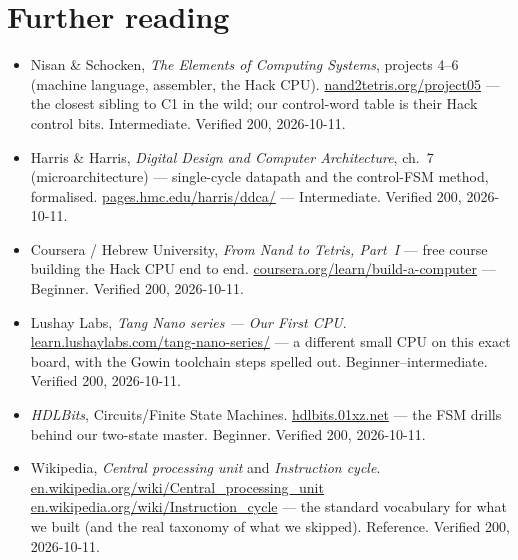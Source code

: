 \section*{Further reading}

\begin{itemize}
\item Nisan \& Schocken, \emph{The Elements of Computing Systems},
projects 4--6 (machine language, assembler, the Hack CPU).\newline
\url{nand2tetris.org/project05} --- the closest sibling to C1 in the
wild; our control-word table is their Hack control bits.
Intermediate. Verified 200, 2026-10-11.
\item Harris \& Harris, \emph{Digital Design and Computer
Architecture}, ch.~7 (microarchitecture) --- single-cycle datapath
and the control-FSM method, formalised.\newline
\url{pages.hmc.edu/harris/ddca/} --- Intermediate. Verified 200,
2026-10-11.
\item Coursera / Hebrew University, \emph{From Nand to Tetris,
Part~I} --- free course building the Hack CPU end to end.\newline
\url{coursera.org/learn/build-a-computer} --- Beginner. Verified
200, 2026-10-11.
\item Lushay Labs, \emph{Tang Nano series --- Our First CPU}.\newline
\url{learn.lushaylabs.com/tang-nano-series/} --- a different small
CPU on this exact board, with the Gowin toolchain steps spelled out.
Beginner--intermediate. Verified 200, 2026-10-11.
\item \emph{HDLBits}, Circuits/Finite State Machines.\newline
\url{hdlbits.01xz.net} --- the FSM drills behind our two-state
master. Beginner. Verified 200, 2026-10-11.
\item Wikipedia, \emph{Central processing unit} and
\emph{Instruction cycle}.\newline
\url{en.wikipedia.org/wiki/Central_processing_unit}\newline
\url{en.wikipedia.org/wiki/Instruction_cycle} --- the standard
vocabulary for what we built (and the real taxonomy of what we
skipped). Reference. Verified 200, 2026-10-11.
\end{itemize}

